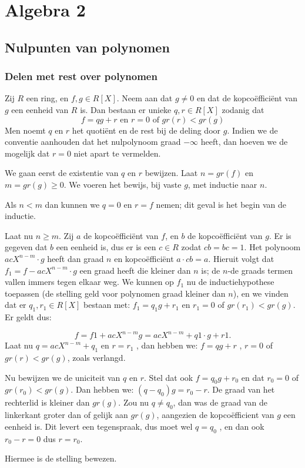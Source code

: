 \documentclass[a4paper,12pt,oneside]{book}
\begin{document}
\part{Algebra 2}

\chapter{Nulpunten van polynomen}

\section{Delen met rest over polynomen}
\begin{stelling}
\label{stelling:3c1}
Zij $R$ een ring, en $f , g \in R[X]$. Neem aan dat $g \ne 0$ en dat de kopcoëfficiënt van $g$ een
eenheid van $R$ is. Dan bestaan er unieke $q, r \in R[X]$ zodanig dat
$$f = qg + r \text{ en } r = 0 \text{ of } gr(r) < gr(g)$$
Men noemt $q$ en $r$ het quotiënt en de rest bij de deling door $g$. Indien we de conventie aanhouden
dat het nulpolynoom graad $-\infty$ heeft, dan hoeven we de mogelijk dat $r = 0$ niet apart te vermelden.
\end{stelling}

\begin{bewijs}
We gaan eerst de existentie van $q$ en $r$ bewijzen.
Laat $n = gr(f)$ en $m = gr(g) \ge 0$. 
We voeren het bewijs, bij vaste $g$, met inductie naar $n$.

Als $n < m$ dan kunnen we $q = 0$ en $r = f$ nemen; dit geval is het begin van de inductie.

Laat nu $n \ge m$. Zij $a$ de kopcoëfficiënt van $f$, en $b$ de kopcoëfficiënt van $g$. Er is gegeven dat $b$ een eenheid is, dus
er is een $c \in R$ zodat $cb = bc = 1$. Het polynoom $acX^{n-m} \cdot g$ heeft dan graad $n$ en kopcoëfficiënt $a \cdot cb = a$. Hieruit volgt dat
$f_1 = f - acX^{n-m} \cdot g$ een graad heeft die kleiner dan $n$ is; de $n$-de graads termen vallen immers tegen elkaar weg. We kunnen
op $f_1$ nu de inductiehypothese toepassen (de stelling geld voor polynomen graad kleiner dan $n$), en we vinden dat er $q_1 , r_1 \in R[X]$ bestaan met:
$f_1 = q_1 g + r_1$
en $r_1 = 0$ of $gr(r_1 ) < gr(g)$.
Er geldt dus:

$$f = f 1 + acX^{n-m} g = acX^{n-m} + q 1 \cdot g + r 1.$$
Laat nu $q = acX^{n-m} + q_1$ en $r = r_1$ , dan hebben we:
$f = qg + r$ ,
$r = 0$ of $gr(r) < gr(g)$,
zoals verlangd.


Nu bewijzen we de uniciteit van $q$ en $r$. Stel dat ook $f = q_0 g + r_0$ en dat $r_0 = 0$ of $gr(r_0 ) < gr(g)$.
Dan hebben we:
$(q - q_0 )g = r_0 - r$.
De graad van het rechterlid is kleiner dan $gr(g)$. Zou nu $q \ne q_0 $, dan was de graad van de linkerkant groter dan of gelijk aan $gr(g)$, aangezien de kopcoëfficient van $g$ een eenheid is. Dit levert een tegenspraak, dus moet wel $q = q_0$ , en dan ook $r_0 - r = 0$ dus $r = r_0$.

Hiermee is de stelling bewezen.
\end{bewijs}
\end{document}

